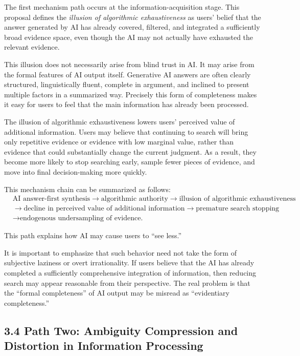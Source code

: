 The first mechanism path occurs at the information-acquisition stage. This proposal defines the \emph{illusion of algorithmic exhaustiveness} as users' belief that the answer generated by AI has already covered, filtered, and integrated a sufficiently broad evidence space, even though the AI may not actually have exhausted the relevant evidence.

This illusion does not necessarily arise from blind trust in AI. It may arise from the formal features of AI output itself. Generative AI answers are often clearly structured, linguistically fluent, complete in argument, and inclined to present multiple factors in a summarized way. Precisely this form of completeness makes it easy for users to feel that the main information has already been processed.

The illusion of algorithmic exhaustiveness lowers users' perceived value of additional information. Users may believe that continuing to search will bring only repetitive evidence or evidence with low marginal value, rather than evidence that could substantially change the current judgment. As a result, they become more likely to stop searching early, sample fewer pieces of evidence, and move into final decision-making more quickly.

This mechanism chain can be summarized as follows:
\[
\begin{aligned}
&\text{AI answer-first synthesis}
\rightarrow
\text{algorithmic authority}
\rightarrow
\text{illusion of algorithmic exhaustiveness} \\
&\rightarrow
\text{decline in perceived value of additional information}
\rightarrow
\text{premature search stopping} \\
&\rightarrow
\text{endogenous undersampling of evidence.}
\end{aligned}
\]

This path explains how AI may cause users to ``see less.''

It is important to emphasize that such behavior need not take the form of subjective laziness or overt irrationality. If users believe that the AI has already completed a sufficiently comprehensive integration of information, then reducing search may appear reasonable from their perspective. The real problem is that the ``formal completeness'' of AI output may be misread as ``evidentiary completeness.''

\subsection*{3.4 Path Two: Ambiguity Compression and Distortion in Information Processing}

